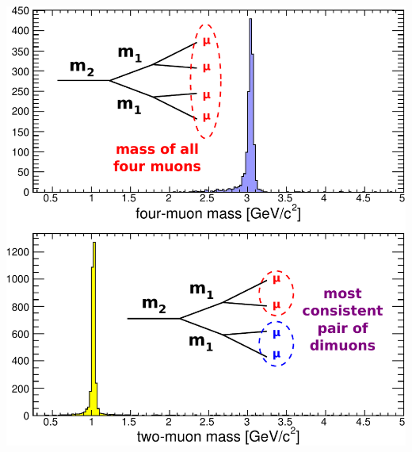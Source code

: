 \documentclass[compress]{beamer}
\begin{document}
\begin{frame}
\begin{columns}
\vspace{0.3 cm}
\includegraphics[width=\linewidth]{four-two-muon-mass.pdf}
\end{columns}
\end{frame}
\end{document}
